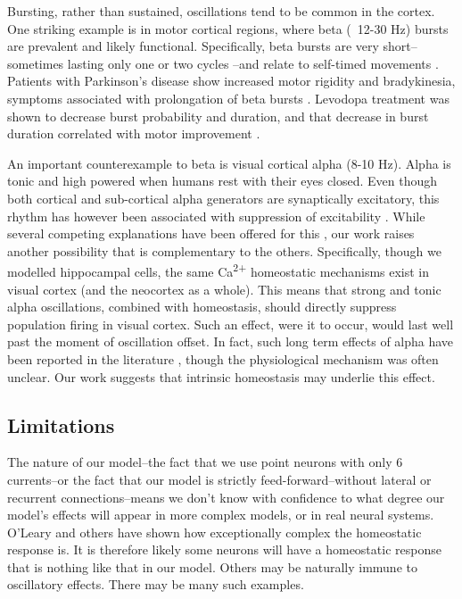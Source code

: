 \documentclass{article}
\begin{document}
Bursting, rather than sustained, oscillations tend to be common in the cortex. One striking example is in motor cortical regions, where beta (~12-30 Hz) bursts are prevalent and likely functional. Specifically, beta bursts are very short--sometimes lasting only one or two cycles \cite{Sherman2016}--and relate to self-timed movements \cite{Feingold2015}. Patients with Parkinson's disease show increased motor rigidity and bradykinesia, symptoms associated with prolongation of beta bursts \cite{Tinkhauser2017}. Levodopa treatment was shown to decrease burst probability and duration, and that decrease in burst duration correlated with motor improvement \cite{Tinkhauser2017}.

An important counterexample to beta is visual cortical alpha (8-10 Hz). Alpha is tonic and high powered when humans rest with their eyes closed. Even though both cortical and sub-cortical alpha generators are synaptically excitatory, this rhythm has however been associated with suppression of excitability \cite{Jensen2002,Bonnefond2012,Peterson2017}. While several competing explanations have been offered for this \cite{Bonnefond2012,Lange2013,Peterson2017}, our work raises another possibility that is complementary to the others. Specifically, though we modelled hippocampal cells, the same Ca\textsuperscript{2+} homeostatic mechanisms exist in visual cortex (and the neocortex as a whole). This means that strong and tonic alpha oscillations, combined with homeostasis, should directly suppress population firing in visual cortex. Such an effect, were it to occur, would last well past the moment of oscillation offset. In fact, such long term effects of alpha have been reported in the literature \cite{Jensen2002,Bonnefond2012}, though the physiological mechanism was often unclear. Our work suggests that intrinsic homeostasis may underlie this effect.

\subsection*{Limitations}
The nature of our model--the fact that we use point neurons with only 6 currents--or the fact that our model is strictly feed-forward--without lateral or recurrent connections--means we don't know with confidence to what degree our model's effects will appear in more complex models, or in real neural systems. O'Leary \citep{OLeary2014} and others have shown how exceptionally complex the homeostatic response is. It is therefore likely some neurons will have a homeostatic response that is nothing like that in our model. Others may be naturally immune to oscillatory effects. There may be many such examples.
\end{document}
